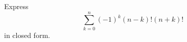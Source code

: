 Express \[\displaystyle\sum_{k=0}^n\left(-1\right)^k\left(n-k\right)!\left(n+k\right)!\] in closed form.